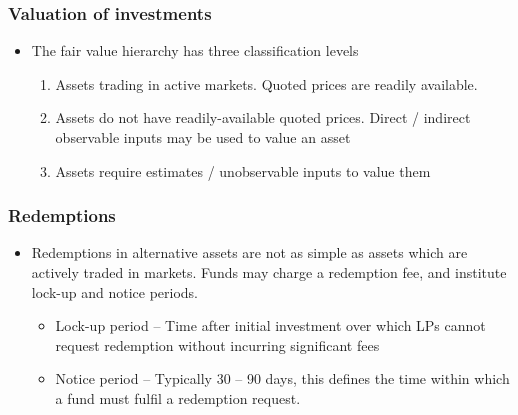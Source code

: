 \documentclass[../notes_compiled.tex]{subfiles}
\begin{document}
\subsubsection{Valuation of investments}
\begin{itemize}
\item The fair value hierarchy has three classification levels
\begin{enumerate}
\item Assets trading in active markets. Quoted prices are readily available.
\item Assets do not have readily-available quoted prices. Direct / indirect observable inputs may be used to value an asset
\item Assets require estimates / unobservable inputs to value them
\end{enumerate}
\end{itemize}

\subsubsection{Redemptions}
\begin{itemize}
\item Redemptions in alternative assets are not as simple as assets which are actively traded in markets. Funds may charge a redemption fee, and institute lock-up and notice periods.
\begin{itemize}
\item Lock-up period -- Time after initial investment over which LPs cannot request redemption without incurring significant fees
\item Notice period -- Typically 30 -- 90 days, this defines the time within which a fund must fulfil a redemption request.
\end{itemize}
\end{itemize}
\end{document}
